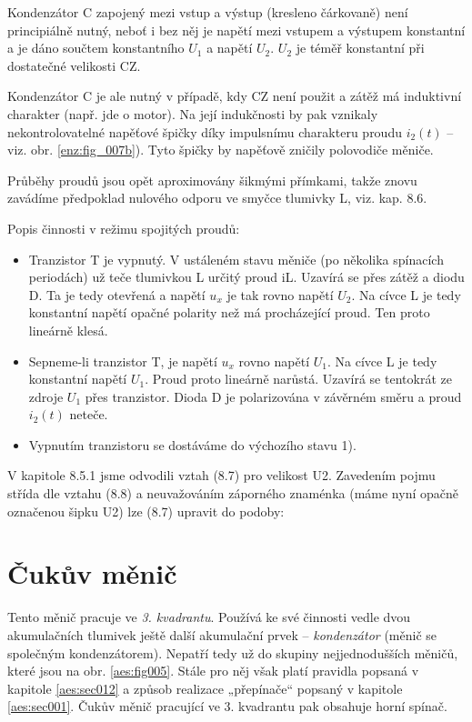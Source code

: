     \begin{note}
      Kondenzátor C zapojený mezi vstup a výstup (kresleno čárkovaně) není principiálně nutný, 
      neboť i bez něj je napětí mezi vstupem a výstupem konstantní a je dáno součtem konstantního 
      \(U_1\) a napětí \(U_2\). \(U_2\) je téměř konstantní při dostatečné velikosti CZ.
      
      Kondenzátor C je ale nutný v případě, kdy CZ není použit a zátěž má induktivní charakter 
      (např. jde o motor). Na její indukčnosti by pak vznikaly nekontrolovatelné napěťové špičky 
      díky impulsnímu charakteru proudu \(i_2(t)\) – viz. obr. \ref{enz:fig_007b}). Tyto špičky by 
      napěťově zničily polovodiče měniče.
    \end{note}
    
    Průběhy proudů jsou opět aproximovány šikmými přímkami, takže znovu zavádíme předpoklad
    nulového odporu ve smyčce tlumivky L, viz. kap. 8.6.
    
    Popis činnosti v režimu spojitých proudů:
    \begin{itemize}
      \item Tranzistor T je vypnutý. V ustáleném stavu měniče (po několika spínacích periodách) už 
            teče tlumivkou L určitý proud iL. Uzavírá se přes zátěž a diodu D. Ta je tedy otevřená 
            a napětí \(u_x\) je tak rovno napětí \(U_2\). Na cívce L je tedy konstantní napětí 
            opačné polarity než má procházející proud. Ten proto lineárně klesá.
      \item Sepneme-li tranzistor T, je napětí \(u_x\) rovno napětí \(U_1\). Na cívce L je tedy 
            konstantní napětí \(U_1\). Proud proto lineárně narůstá. Uzavírá se tentokrát ze zdroje 
            \(U_1\) přes tranzistor. Dioda D je polarizována v závěrném směru a proud \(i_2(t)\) 
            neteče.
      \item Vypnutím tranzistoru se dostáváme do výchozího stavu 1).
    \end{itemize}
    
    V kapitole 8.5.1 jsme odvodili vztah (8.7) pro velikost U2. Zavedením pojmu střída dle vztahu 
    (8.8) a neuvažováním záporného znaménka (máme nyní opačně označenou šipku U2) lze (8.7) upravit 
    do podoby:
    
  \section{Čukův měnič}\label{aes:sec004}
    Tento měnič pracuje ve \emph{3. kvadrantu}. Používá ke své činnosti vedle dvou akumulačních 
    tlumivek ještě další akumulační prvek – \emph{kondenzátor} (měnič se společným kondenzátorem). 
    Nepatří tedy už do skupiny nejjednodušších měničů, které jsou na obr. \ref{aes:fig005}. Stále 
    pro něj však platí pravidla popsaná v kapitole \ref{aes:sec012} a způsob realizace „přepínače“ 
    popsaný v kapitole \ref{aes:sec001}. Čukův měnič pracující ve 3. kvadrantu pak obsahuje horní 
    spínač.
    
